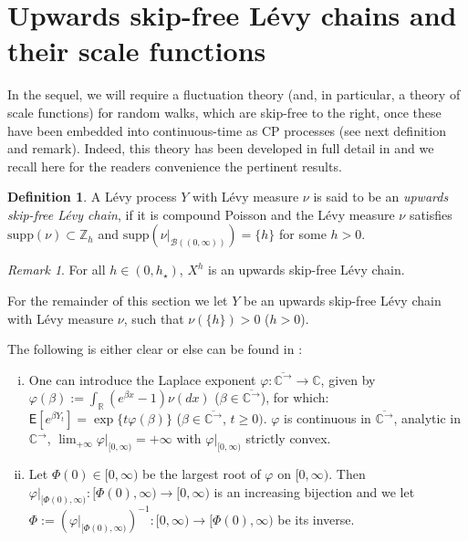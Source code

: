 \documentclass[pdftex,oneside,11pt,reqno]{amsart}
\theoremstyle{definition}
\newtheorem{definition}{Definition}[section]
\theoremstyle{theorem}
\theoremstyle{remark}
\newtheorem{remark}{Remark}[section]
\numberwithin{equation}{section}
\numberwithin{definition}{section}
\begin{document}
\section{Upwards skip-free L\'evy chains and their scale functions}\label{section:upwards_skip_free}
In the sequel, we will require a fluctuation theory (and, in particular, a
theory of scale functions) for random walks, which are skip-free to the right,
once these have been embedded into continuous-time as CP processes (see next
definition and remark). Indeed, this theory has been developed in full detail
in \cite{vidmar:fluctuation_theory} and we recall here for the readers
convenience the pertinent results. 

\begin{definition} 
\label{def:USF_Levy_chain}
A L\'evy process $Y$ with L\'evy measure ${\nu}$ is
said to be an \emph{upwards skip-free L\'evy chain}, if it is compound Poisson
and the L\'evy measure ${\nu}$ satisfies
${\mathrm{supp}}({\nu})\subset
{\mathbb{Z}_h}$ and ${\mathrm{supp}}({\nu}\vert_{\mathcal{B}((0,\infty))})=\{h\}$ 
for some $h>0$.
\end{definition}

\begin{remark}\label{remark:ours_are_usf}
For all $h\in (0,h_\star)$, $X^h$ is an upwards skip-free L\'evy chain.
\end{remark}
For the remainder of this section we let $Y$ be an upwards skip-free L\'evy chain with L\'evy measure ${\nu}$, such that ${\nu}(\{h\})>0$ ($h>0$).

The following is either clear or else can be found in \cite[Subsection 3.1]{vidmar:fluctuation_theory}:
\begin{enumerate}[(i)]
\item One can introduce the Laplace exponent $\varphi:{\overline{\mathbb{C}^{\rightarrow}}}\to\mathbb{C}$,
given by $\varphi(\beta):=\int_{\mathbb{R}}(e^{\beta x}-1){\nu}(dx)$
($\beta\in {\overline{\mathbb{C}^{\rightarrow}}}$), for which: ${\mathsf E}[e^{\beta Y_t}]=\exp\{t\varphi(\beta)\}$
($\beta\in {\overline{\mathbb{C}^{\rightarrow}}}$, $t\geq 0)$. $\varphi$ is continuous in ${\overline{\mathbb{C}^{\rightarrow}}}$, analytic in
${\mathbb{C}^{\rightarrow}}$, $\lim_{+\infty}\varphi\vert_{[0,\infty)}=+\infty$ with
$\varphi\vert_{[0,\infty)}$ strictly convex.  
 \item Let
$\Phi(0)\in [0,\infty)$ be the largest root of $\varphi$ on $[0,\infty)$.
Then $\varphi\vert_{[\Phi(0),\infty)}:[\Phi(0),\infty)\to [0,\infty)$ is an
increasing bijection and we let
$\Phi:=(\varphi\vert_{[\Phi(0),\infty)})^{-1}:[0,\infty)\to [\Phi(0),\infty)$
be its inverse.
\end{enumerate}
\end{document}
